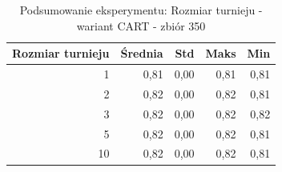 \begin{table}[htbp]
\centering
\small
\setlength{\tabcolsep}{6pt}
\renewcommand{\arraystretch}{1.2}
\caption{Podsumowanie eksperymentu: Rozmiar turnieju - wariant CART - zbiór 350}
\label{tab:CART_tournament_size_350}
\begin{tabular}{r|r|r|r|r}
\toprule
Rozmiar turnieju & Średnia & Std & Maks & Min \\
\hline
1 & 0,81 & 0,00 & 0,81 & 0,81 \\
2 & 0,82 & 0,00 & 0,82 & 0,81 \\
3 & 0,82 & 0,00 & 0,82 & 0,82 \\
5 & 0,82 & 0,00 & 0,82 & 0,81 \\
10 & 0,82 & 0,00 & 0,82 & 0,81 \\
\bottomrule
\end{tabular}
\end{table}